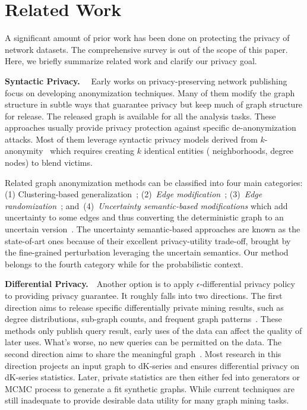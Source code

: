 \section{Related Work}
A significant amount of prior work has been done on protecting the privacy of network datasets.
The comprehensive survey is out of the scope of this paper. 
Here, we briefly summarize related work and clarify our privacy goal. 

\textbf{Syntactic Privacy.}~~
Early works on privacy-preserving network publishing focus on developing anonymization techniques. 
Many of them modify the graph structure in subtle ways that guarantee privacy but keep much of graph structure for release. 
The released graph is available for all the analysis tasks. 
These approaches usually provide privacy protection against specific de-anonymization attacks. 
Most of them leverage syntactic privacy models derived from $k$-anonymity~\cite{Sweeney:2002:KAM:774544.774552} which requires creating $k$ identical entities ({\eg} neighborhoods, degree nodes) to blend victims. 

Related graph anonymization methods can be classified into four main categories: (1) Clustering-based generalization~\cite{Hay_Anonymizing_2007,Bhagat_Class_2009,hay2010resisting}; (2)~{\em Edge modification}~\cite{Liu_Towards_2008, Zhou_Preserving_2008, Wang2011, Wu_k_2010, Skarkala_Privacy_2012}; 
(3)~{\em Edge randomization}~\cite{Liu_Privacy_2009,Ying_Randomizing_2008, Ninggal_Utility_2015};
and~(4)~{\em Uncertainty semantic-based modifications} which add uncertainty to some edges and thus converting the deterministic graph to an uncertain version~\cite{Boldi_Injecting_2012, Nguyen_Anonymizing_2015}. The uncertainty semantic-based approaches are known as the state-of-art ones because of their excellent privacy-utility trade-off, brought by the fine-grained perturbation leveraging the uncertain semantics. 
Our method belongs to the fourth category while for the probabilistic context. 

 
\textbf{Differential Privacy.}~~Another option is to apply {$\epsilon$}-differential privacy policy to providing privacy guarantee. It roughly falls into two directions. The first direction aims to release specific differentially private mining results, such as degree distributions, sub-graph counts, and frequent graph patterns~\cite{Xiao_Differentially_2014,Day:2016}. These methods only publish query result, early uses of the data can affect the quality of later uses. What's worse, no new queries can be permitted on the data. The second direction aims to share the meaningful graph~\cite{Sala_Sharing_2011}. Most research in this direction projects an input graph to dK-series and ensures differential privacy on dK-series statistics. Later, private statistics are then either fed into generators or MCMC process to generate a fit synthetic graphs. While current techniques are still inadequate to provide desirable data utility for many graph mining tasks. 

